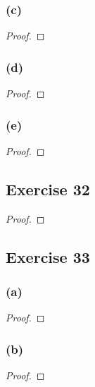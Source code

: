 \documentclass[14pt]{extarticle}
\begin{document}
\subsubsection{(c)}

\begin{proof}

\end{proof}

\subsubsection{(d)}

\begin{proof}

\end{proof}

\subsubsection{(e)}

\begin{proof}

\end{proof}

\subsection{Exercise 32}

\begin{proof}

\end{proof}

\subsection{Exercise 33}

\subsubsection{(a)}

\begin{proof}

\end{proof}

\subsubsection{(b)}

\begin{proof}

\end{proof}
\end{document}
